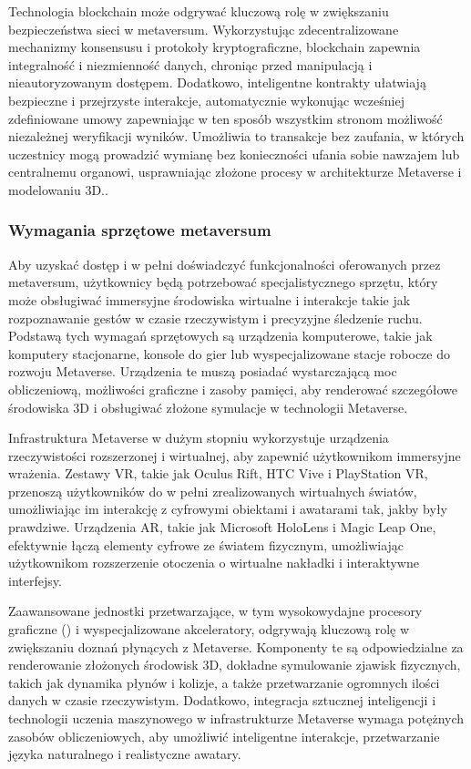 Technologia blockchain może odgrywać kluczową rolę w zwiększaniu bezpieczeństwa sieci w metaversum. Wykorzystując zdecentralizowane mechanizmy konsensusu i protokoły kryptograficzne, blockchain zapewnia integralność i niezmienność danych, chroniąc przed manipulacją i nieautoryzowanym dostępem. Dodatkowo, inteligentne kontrakty ułatwiają bezpieczne i przejrzyste interakcje, automatycznie wykonując wcześniej zdefiniowane umowy zapewniając w ten sposób wszystkim stronom możliwość niezależnej weryfikacji wyników. Umożliwia to transakcje bez zaufania, w których uczestnicy mogą prowadzić wymianę bez konieczności ufania sobie nawzajem lub centralnemu organowi, usprawniając złożone procesy w architekturze Metaverse i modelowaniu 3D.\cite{metaverseInfrastructureIEEE}.

\subsubsection{Wymagania sprzętowe metaversum}

Aby uzyskać dostęp i w pełni doświadczyć funkcjonalności oferowanych przez metaversum, użytkownicy będą potrzebować specjalistycznego sprzętu, który może obsługiwać immersyjne środowiska wirtualne i interakcje takie jak rozpoznawanie gestów w czasie rzeczywistym i precyzyjne śledzenie ruchu. Podstawą tych wymagań sprzętowych są urządzenia komputerowe, takie jak komputery stacjonarne, konsole do gier lub wyspecjalizowane stacje robocze do rozwoju Metaverse. Urządzenia te muszą posiadać wystarczającą moc obliczeniową, możliwości graficzne i zasoby pamięci, aby renderować szczegółowe środowiska 3D i obsługiwać złożone symulacje w technologii Metaverse\cite{metaverseInfrastructureIEEE}.

Infrastruktura Metaverse w dużym stopniu wykorzystuje urządzenia rzeczywistości rozszerzonej i wirtualnej, aby zapewnić użytkownikom immersyjne wrażenia. Zestawy VR, takie jak Oculus Rift, HTC Vive i PlayStation VR, przenoszą użytkowników do w pełni zrealizowanych wirtualnych światów, umożliwiając im interakcję z cyfrowymi obiektami i awatarami tak, jakby były prawdziwe. Urządzenia AR, takie jak Microsoft HoloLens i Magic Leap One, efektywnie łączą elementy cyfrowe ze światem fizycznym, umożliwiając użytkownikom rozszerzenie otoczenia o wirtualne nakładki i interaktywne interfejsy\cite{metaverseInfrastructureIEEE}.

Zaawansowane jednostki przetwarzające, w tym wysokowydajne procesory graficzne  () i wyspecjalizowane akceleratory, odgrywają kluczową rolę w zwiększaniu doznań płynących z Metaverse. Komponenty te są odpowiedzialne za renderowanie złożonych środowisk 3D, dokładne symulowanie zjawisk fizycznych, takich jak dynamika płynów i kolizje, a także przetwarzanie ogromnych ilości danych w czasie rzeczywistym. Dodatkowo, integracja sztucznej inteligencji i technologii uczenia maszynowego w infrastrukturze Metaverse wymaga potężnych zasobów obliczeniowych, aby umożliwić inteligentne interakcje, przetwarzanie języka naturalnego i realistyczne awatary\cite{metaverseInfrastructureIEEE}.

